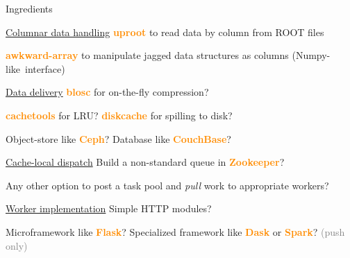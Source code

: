 \documentclass[aspectratio=169]{beamer}
\begin{document}
\begin{frame}{Ingredients}
\vspace{0.2 cm}
\begin{block}{\underline{Columnar data handling}}
\textcolor{darkorange}{\bf uproot} to read data by column from ROOT files

\textcolor{darkorange}{\bf awkward-array} to manipulate jagged data structures as columns \mbox{(Numpy-like interface)\hspace{-1 cm}}
\end{block}

\begin{block}{\underline{Data delivery}}
\textcolor{darkorange}{\bf blosc} for on-the-fly compression?

\textcolor{darkorange}{\bf cachetools} for LRU? \textcolor{darkorange}{\bf diskcache} for spilling to disk?

Object-store like \textcolor{darkorange}{\bf Ceph}? Database like \textcolor{darkorange}{\bf CouchBase}?
\end{block}

\begin{block}{\underline{Cache-local dispatch}}
Build a non-standard queue in \textcolor{darkorange}{\bf Zookeeper}?

Any other option to post a task pool and {\it pull} work to appropriate workers?
\end{block}

\begin{block}{\underline{Worker implementation}}
Simple HTTP modules?

Microframework like \textcolor{darkorange}{\bf Flask}? Specialized framework like \textcolor{darkorange}{\bf Dask} or \textcolor{darkorange}{\bf Spark}? \textcolor{gray}{(push only)}
\end{block}
\end{frame}
\end{document}
